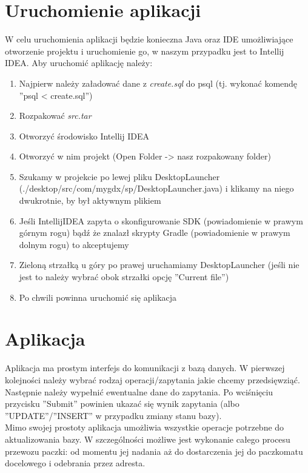 \documentclass{article} %
\begin{document}
\section*{Uruchomienie aplikacji}
	W celu uruchomienia aplikacji będzie konieczna Java oraz IDE umożliwiające otworzenie projektu i uruchomienie go, w naszym przypadku jest to Intellij IDEA. Aby uruchomić aplikację należy: 
	\begin{enumerate}
	\item Najpierw należy załadować dane z \textit{create.sql} do psql (tj. wykonać komendę ''psql < create.sql'') 
	\item Rozpakować \textit{src.tar}
	\item Otworzyć środowisko Intellij IDEA
	\item Otworzyć w nim projekt (Open Folder -> {nasz rozpakowany folder})
	\item Szukamy w projekcie po lewej pliku DesktopLauncher (./desktop/src/com/mygdx/sp/DesktopLauncher.java) i klikamy na niego dwukrotnie, by był aktywnym plikiem
	\item Jeśli IntellijIDEA zapyta o skonfigurowanie SDK (powiadomienie w prawym górnym rogu) bądź że znalazł skrypty Gradle (powiadomienie w prawym dolnym rogu) to akceptujemy
	\item Zieloną strzałką u góry po prawej uruchamiamy DesktopLauncher (jeśli nie jest to należy wybrać obok strzałki opcję ''Current file'')
	\item 	Po chwili powinna uruchomić się aplikacja
	\end{enumerate}
\section*{Aplikacja}
	Aplikacja ma prostym interfejs do komunikacji z bazą danych. W pierwszej kolejności należy wybrać rodzaj operacji/zapytania jakie chcemy przedsięwziąć. Następnie należy wypełnić ewentualne dane do zapytania. Po wciśnięciu przycisku ''Submit'' powinien ukazać się wynik zapytania (albo ''UPDATE''/''INSERT'' w przypadku zmiany stanu bazy). \\ 
	Mimo swojej prostoty aplikacja umożliwia wszystkie operacje potrzebne do aktualizowania bazy. W szczególności możliwe jest wykonanie całego procesu przewozu paczki: od momentu jej nadania aż do dostarczenia jej do paczkomatu docelowego i odebrania przez adresta.
\end{document}
